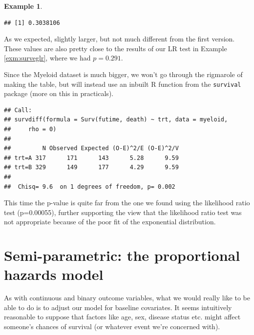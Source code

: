 \documentclass[
  openany]{book}
\newenvironment{Shaded}{\begin{snugshade}}{\end{snugshade}}
\newcommand{\AttributeTok}[1]{\textcolor[rgb]{0.13,0.29,0.53}{#1}}
\newcommand{\DecValTok}[1]{\textcolor[rgb]{0.00,0.00,0.81}{#1}}
\newcommand{\FunctionTok}[1]{\textcolor[rgb]{0.13,0.29,0.53}{\textbf{#1}}}
\newcommand{\NormalTok}[1]{#1}
\newcommand{\OtherTok}[1]{\textcolor[rgb]{0.56,0.35,0.01}{#1}}
\newcommand{\SpecialCharTok}[1]{\textcolor[rgb]{0.81,0.36,0.00}{\textbf{#1}}}
\theoremstyle{definition}
\theoremstyle{definition}
\newtheorem{example}{Example}[chapter]
\theoremstyle{definition}
\theoremstyle{definition}
\theoremstyle{remark}
\begin{document}
\begin{example}
\begin{verbatim}
## [1] 0.3038106
\end{verbatim}

As we expected, slightly larger, but not much different from the first version. These values are also pretty close to the results of our LR test in Example \ref{exm:surveglr}, where we had \(p=0.291\).

Since the Myeloid dataset is much bigger, we won't go through the rigmarole of making the table, but will instead use an inbuilt R function from the \texttt{survival} package (more on this in practicals).

\begin{Shaded}
\end{Shaded}

\begin{verbatim}
## Call:
## survdiff(formula = Surv(futime, death) ~ trt, data = myeloid, 
##     rho = 0)
## 
##         N Observed Expected (O-E)^2/E (O-E)^2/V
## trt=A 317      171      143      5.28      9.59
## trt=B 329      149      177      4.29      9.59
## 
##  Chisq= 9.6  on 1 degrees of freedom, p= 0.002
\end{verbatim}

This time the p-value is quite far from the one we found using the likelihood ratio test (p=0.00055), further supporting the view that the likelihood ratio test was not appropriate because of the poor fit of the exponential distribution.
\end{example}

\hypertarget{semi-parametric-the-proportional-hazards-model}{%
\section{Semi-parametric: the proportional hazards model}\label{semi-parametric-the-proportional-hazards-model}}

As with continuous and binary outcome variables, what we would really like to be able to do is to adjust our model for baseline covariates. It seems intuitively reasonable to suppose that factors like age, sex, disease status etc. might affect someone's chances of survival (or whatever event we're concerned with).
\end{document}
